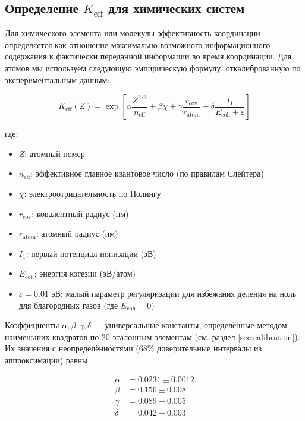\documentclass[12pt,a4paper]{article}
\theoremstyle{remark}
\newcommand{\Keff}{K_{\mathrm{eff}}}
\begin{document}
	\subsection{Определение $\Keff$ для химических систем}
	
	Для химического элемента или молекулы эффективность координации определяется как отношение максимально возможного информационного содержания к фактически переданной информации во время координации. Для атомов мы используем следующую эмпирическую формулу, откалиброванную по экспериментальным данным:
	
	\begin{equation}
		\Keff(Z) = \exp\left[\alpha \frac{Z^{2/3}}{n_{\text{eff}}} + \beta \chi + \gamma \frac{r_{\text{cov}}}{r_{\text{atom}}} + \delta \frac{I_1}{E_{\text{coh}} + \varepsilon}\right]
		\label{eq:keff-element}
	\end{equation}
	
	где:
	\begin{itemize}
		\item $Z$: атомный номер
		\item $n_{\text{eff}}$: эффективное главное квантовое число (по правилам Слейтера)
		\item $\chi$: электроотрицательность по Полингу
		\item $r_{\text{cov}}$: ковалентный радиус (пм)
		\item $r_{\text{atom}}$: атомный радиус (пм)
		\item $I_1$: первый потенциал ионизации (эВ)
		\item $E_{\text{coh}}$: энергия когезии (эВ/атом)
		\item $\varepsilon = 0.01$ эВ: малый параметр регуляризации для избежания деления на ноль для благородных газов (где $E_{\text{coh}} = 0$)
	\end{itemize}
	
	Коэффициенты $\alpha, \beta, \gamma, \delta$ — универсальные константы, определённые методом наименьших квадратов по 20 эталонным элементам (см. раздел \ref{sec:calibration}). Их значения с неопределённостями (68\% доверительные интервалы из аппроксимации) равны:
	
	\begin{align}
		\alpha &= 0.0231 \pm 0.0012 \\
		\beta &= 0.156 \pm 0.008 \\
		\gamma &= 0.089 \pm 0.005 \\
		\delta &= 0.042 \pm 0.003
	\end{align}
	
\end{document}
